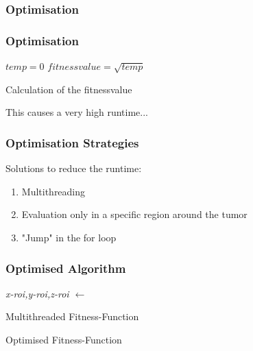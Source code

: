 \documentclass{beamer}
\begin{document}
 
 \subsubsection{Optimisation}
 \begin{frame}
 \frametitle{Optimisation}
 \IncMargin{1em}
 \begin{algorithm}[H]
 $temp=0$\;
 $fitnessvalue = \sqrt{temp}$\;
 \;
 \caption{Calculation of the fitnessvalue}
 \end{algorithm}
 \DecMargin{1em}
 \color{red}This causes a very high runtime...
 \end{frame}
 
 \begin{frame}
 \frametitle{Optimisation Strategies}
 Solutions to reduce the runtime:
 \begin{enumerate}
 \item Multithreading
 \item Evaluation only in a specific region around the tumor
 \item "Jump" in the for loop
 \end{enumerate}
 
 \end{frame}
 
 \begin{frame}
 \frametitle{Optimised Algorithm}
 \IncMargin{1em}
 \begin{algorithm}[H]

 \emph{x-roi,y-roi,z-roi $\leftarrow$}   \;
 \caption{Multithreaded Fitness-Function}
 \end{algorithm}
 \DecMargin{1em}
 
 \IncMargin{1em}
 \begin{algorithm}[H]


 \caption{Optimised Fitness-Function}
 \end{algorithm}
 \DecMargin{1em}
 
\end{frame}
 
\end{document}
